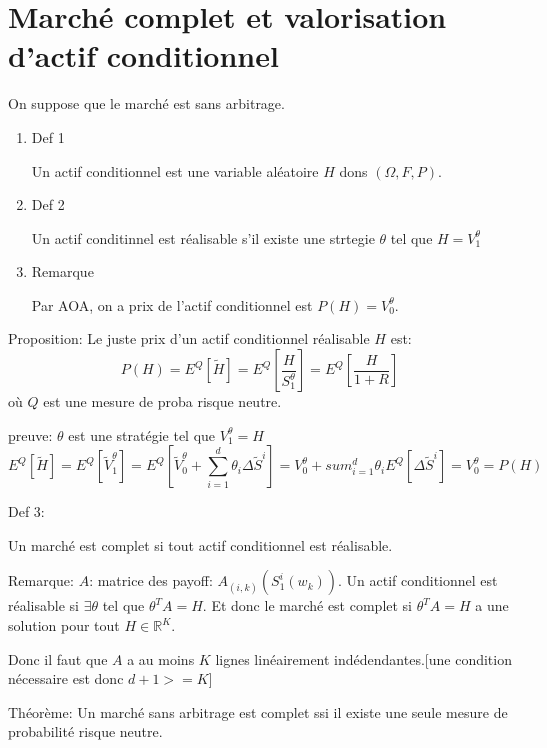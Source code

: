 \documentclass{article}
\begin{document}
\section{March\'e complet et valorisation d'actif conditionnel}

On suppose que le march\'e est sans arbitrage.

\begin{enumerate}
	\item Def 1
	
Un actif conditionnel est une variable al\'eatoire $H$ dons $(\Omega, F, P)$.
	
	\item Def 2
	
	Un actif conditinnel est r\'ealisable s'il existe une strtegie $\theta$ tel que $H=V_1^\theta$
	
	\item Remarque
	
	Par AOA, on a prix de l'actif conditionnel est $P(H)=V_0^\theta$.
\end{enumerate}

Proposition: Le juste prix d'un actif conditionnel r\'ealisable $H$ est:
\begin{equation}
P(H) = E^Q[\tilde{H}]=E^Q[\frac{H}{S_1^\theta}]=E^Q[\frac{H}{1+R}]
\end{equation}
o\`u $Q$ est une mesure de proba risque neutre.

\b{preuve}: 
$\theta$ est une strat\'egie tel que $V_1^\theta=H$
\begin{equation}
E^Q[\tilde{H}]=E^Q[\tilde{V}_1^\theta]=E^Q[\tilde{V}_0^\theta+\sum_{i=1}^d \theta_i \Delta \tilde{S}^i]=V_0^\theta+sum_{i=1}^d \theta_i E^Q[\Delta \tilde{S}^i]=V_0^\theta=P(H)
\end{equation}

Def 3:

Un march\'e est complet si tout actif conditionnel est r\'ealisable.


Remarque: 
$A$: matrice des payoff: $A_{(i,k)}(S_1^i(w_k))$. Un actif conditionnel est r\'ealisable si $\exists \theta$ tel que $\theta^T A=H$. Et donc le march\'e est complet si $\theta^T A=H$ a une solution pour tout $H\in \mathbb{R}^K$.	

Donc il faut que $A$ a au moins $K$ lignes lin\'eairement ind\'edendantes.[une condition n\'ecessaire est donc $d+1>=K$]

Th\'eor\`eme: Un march\'e sans arbitrage est complet ssi il existe une seule mesure de probabilit\'e risque neutre.
\end{document}
